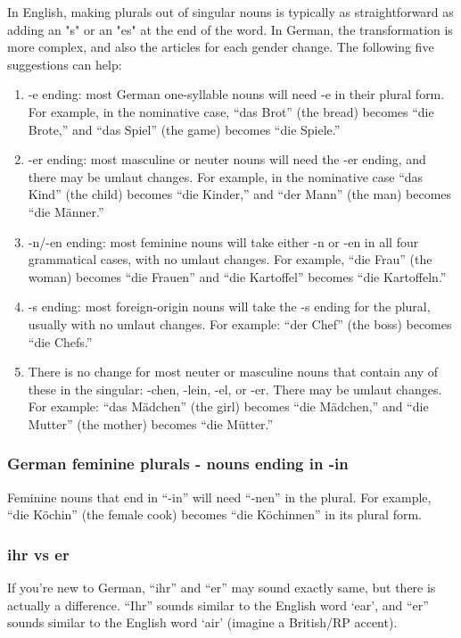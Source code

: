 In English, making plurals out of singular nouns is typically as straightforward as adding an "s" or an "es" at the end of the word. In German, the transformation is more complex, and also the articles for each gender change. The following five suggestions can help:
\begin{enumerate}
  \item  -e ending: most German one-syllable nouns will need -e in their plural form. For example, in the nominative case, ``das Brot'' (the bread) becomes ``die Brote,'' and ``das Spiel'' (the game) becomes ``die Spiele.''
	\item  -er ending: most masculine or neuter nouns will need the -er ending, and there may be umlaut changes. For example, in the nominative case ``das Kind'' (the child) becomes ``die Kinder,'' and ``der Mann'' (the man) becomes ``die M{\"a}nner.''
	\item  -n/-en ending: most feminine nouns will take either -n or -en in all four grammatical cases, with no umlaut changes. For example, ``die Frau'' (the woman) becomes ``die Frauen'' and ``die Kartoffel'' becomes ``die Kartoffeln.''
	\item  -s ending: most foreign-origin nouns will take the -s ending for the plural, usually with no umlaut changes. For example: ``der Chef'' (the boss) becomes ``die Chefs.''
	\item  There is no change for most neuter or masculine nouns that contain any of these in the singular: -chen, -lein, -el, or -er. There may be umlaut changes. For example: ``das M{\"a}dchen'' (the girl) becomes ``die M{\"a}dchen,'' and ``die Mutter'' (the mother) becomes ``die M{\"u}tter.''
\end{enumerate}

\subsubsection{German feminine plurals - nouns ending in -in}

Feminine nouns that end in ``-in'' will need ``-nen'' in the plural. For example, ``die K{\"o}chin'' (the female cook) becomes ``die K{\"o}chinnen'' in its plural form.

\subsubsection{ihr vs er}

If you're new to German, ``ihr'' and ``er'' may sound exactly same, but there is actually a difference. ``Ihr'' sounds similar to the English word `ear', and ``er'' sounds similar to the English word `air' (imagine a British/RP accent).

